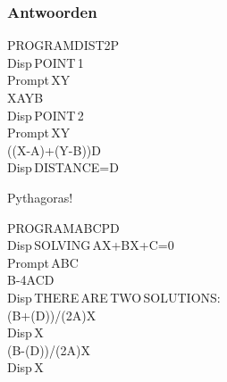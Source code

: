 \begin{frame}
\frametitle{Antwoorden}

\begin{ticalc}[4.2cm]
	PROGRAM\:DIST2P \\%
	\:Disp\,\qt POINT\,1\:\qt \\%
	\:Prompt\,X\comma Y \\%
	\:X\>A\:Y\>B \\%
	\:Disp\,\qt POINT\,2\:\qt \\%
	\:Prompt\,X\comma Y \\%
	\:\sqrt((X-A)\sq+(Y-B)\sq)\>D \\%
	\:Disp\,\qt DISTANCE=\qt\comma D%
\end{ticalc}
Pythagoras!

\vspace{0.3cm}

\begin{ticalc}[6.7cm]
	PROGRAM\:ABCPD \\%
	\:Disp\,\qt SOLVING\,AX\sq+BX+C=0\qt \\%
	\:Prompt\,A\comma B\comma C \\%
	\:B\sq-4AC\>D \\%
	\:Disp\,\qt THERE\,ARE\,TWO\,SOLUTIONS:\qt \\%
	\:(\min B+\sqrt(D))/(2A)\>X \\%
	\:Disp\,X \\%
	\:(\min B-\sqrt(D))/(2A)\>X \\%
	\:Disp\,X%
\end{ticalc}

\end{frame}


